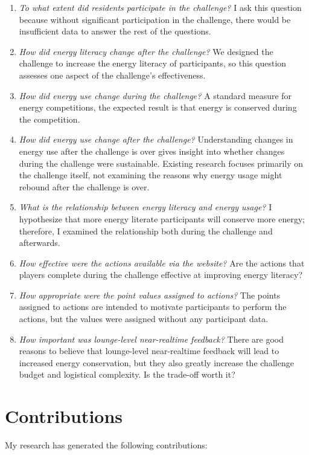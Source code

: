 \begin{enumerate}
	\item \emph{To what extent did residents participate in the challenge?} I ask this question because without significant participation in the challenge, there would be insufficient data to answer the rest of the questions.
	\item \emph{How did energy literacy change after the challenge?} We designed the challenge to increase the energy literacy of participants, so this question assesses one aspect of the challenge's effectiveness.
	\item \emph{How did energy use change during the challenge?} A standard measure for energy competitions, the expected result is that energy is conserved during the competition.
	\item \emph{How did energy use change after the challenge?} Understanding changes in energy use after the challenge is over gives insight into whether changes during the challenge were sustainable. Existing research focuses primarily on the challenge itself, not examining the reasons why energy usage might rebound after the challenge is over.
	\item \emph{What is the relationship between energy literacy and energy usage?} I hypothesize that more energy literate participants will conserve more energy; therefore, I examined the relationship both during the challenge and afterwards.
	\item \emph{How effective were the \emph{actions} available via the website?} Are the actions that players complete during the challenge effective at improving energy literacy?
	\item \emph{How appropriate were the point values assigned to actions?} The points assigned to actions are intended to motivate participants to perform the actions, but the values were assigned without any participant data.
	\item \emph{How important was lounge-level near-realtime feedback?} There are good reasons to believe that lounge-level near-realtime feedback will lead to increased energy conservation, but they also greatly increase the challenge budget and logistical complexity. Is the trade-off worth it?
\end{enumerate}


\section{Contributions}

My research has generated the following contributions:

